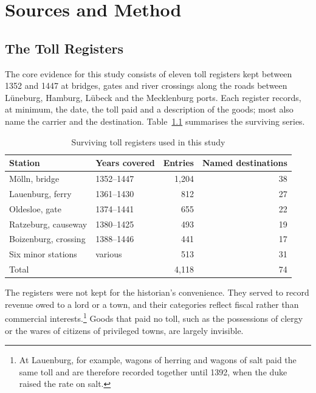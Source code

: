 \chapter{Sources and Method}
\label{ch:sources}

\section{The Toll Registers}

The core evidence for this study consists of eleven toll registers kept between 1352 and 1447 at bridges, gates and river crossings along the roads between Lüneburg, Hamburg, Lübeck and the Mecklenburg ports. Each register records, at minimum, the date, the toll paid and a description of the goods; most also name the carrier and the destination. Table~\ref{tab:registers} summarises the surviving series.

\begin{table}[tbp]
  \centering
  \caption{Surviving toll registers used in this study}
  \label{tab:registers}
  \begin{tabular}{@{}l l r r@{}}
    \toprule
    Station & Years covered & Entries & Named destinations \\
    \midrule
    Mölln, bridge         & 1352--1447 & 1{,}204 & 38 \\
    Lauenburg, ferry      & 1361--1430 &   812 & 27 \\
    Oldesloe, gate        & 1374--1441 &   655 & 22 \\
    Ratzeburg, causeway   & 1380--1425 &   493 & 19 \\
    Boizenburg, crossing  & 1388--1446 &   441 & 17 \\
    Six minor stations    & various    &   513 & 31 \\
    \midrule
    Total                 &            & 4{,}118 & 74 \\
    \bottomrule
  \end{tabular}
\end{table}

The registers were not kept for the historian's convenience. They served to record revenue owed to a lord or a town, and their categories reflect fiscal rather than commercial interests.\footnote{At Lauenburg, for example, wagons of herring and wagons of salt paid the same toll and are therefore recorded together until 1392, when the duke raised the rate on salt.} Goods that paid no toll, such as the possessions of clergy or the wares of citizens of privileged towns, are largely invisible.


